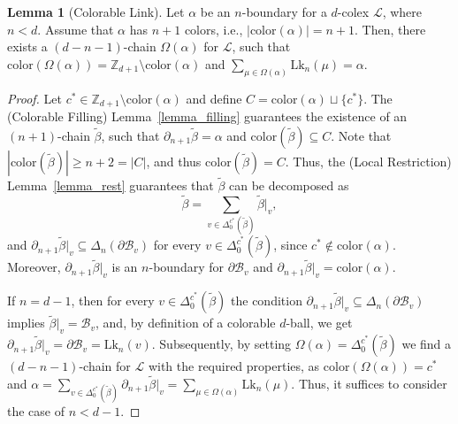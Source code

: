 \documentclass[onecolumn,letterpaper,11pt,accepted=2022-12-19]{quantumarticle}
\newcommand{\face}[2]{{\Delta_{#1}(#2)}}
\newcommand{\facex}[3]{{\Delta^{#1}_{#2}(#3)}}
\newcommand{\link}[2]{{\mathrm{Lk}_{#1}(#2)}}
\newcommand{\rest}[1]{|_{#1}}
\newcommand{\col}[1]{{\mathrm{color}(#1)}}
\theoremstyle{definition}
\newtheorem{lemma}{Lemma}
\theoremstyle{lemma}
\theoremstyle{theorem}
\theoremstyle{corollary}
\begin{document}
{\begin{lemma}[Colorable Link]
\label{lemma_link}
Let $\alpha$ be an $n$-boundary for a $d$-colex $\mathcal{L}$, where $n<d$.
Assume that $\alpha$ has $n+1$ colors, i.e., $|\col \alpha| = n+1$.
Then, there exists a $(d-n-1)$-chain $\Omega(\alpha)$ for $\mathcal{L}$, such that $\col{\Omega(\alpha)} = \mathbb{Z}_{d+1}\setminus \col\alpha$ and $\sum_{\mu \in \Omega(\alpha)} \link n \mu = \alpha$.
\end{lemma}


\begin{proof}
Let $c^*\in\mathbb Z_{d+1}\setminus\col\alpha$ and define $C = \col\alpha \sqcup \{ c^* \}$.
The (Colorable Filling) Lemma~\ref{lemma_filling} guarantees the existence of an $(n+1)$-chain $\widetilde\beta$, such that $\partial_{n+1}\widetilde\beta = \alpha$ and $\col{\widetilde\beta} \subseteq C$.
Note that $|\col{\widetilde\beta}| \geq n+2 = |C|$, and thus $\col{\widetilde\beta} = C$.
Thus, the (Local Restriction) Lemma~\ref{lemma_rest} guarantees that $\widetilde\beta$ can be decomposed as
\begin{equation}
\widetilde\beta = \sum_{v \in \facex {c^*} 0 {\widetilde\beta}} \widetilde\beta\rest v,
\end{equation}
and $\partial_{n+1}\widetilde\beta\rest v \subseteq \face n {\partial\mathcal{B}_v}$ for every $v \in \facex {c^*} 0 {\widetilde\beta}$, since $c^* \not\in\col\alpha$.
Moreover, $\partial_{n+1}\widetilde\beta\rest v$ is an $n$-boundary for $\partial\mathcal{B}_v$ and $\partial_{n+1} \widetilde\beta\rest v = \col\alpha$.

If $n = d-1$, then for every $v \in \facex {c^*} 0 {\widetilde\beta}$ the condition $\partial_{n+1}\widetilde\beta\rest v \subseteq \face n {\partial\mathcal{B}_v}$ implies $\widetilde\beta\rest v = \mathcal{B}_v$, and, by definition of a colorable $d$-ball, we get $\partial_{n+1}\widetilde\beta\rest v = \partial \mathcal{B}_v = \link n v$.
Subsequently, by setting $\Omega(\alpha) = \facex {c^*} 0 {\widetilde\beta}$ we find a $(d-n-1)$-chain for $\mathcal{L}$ with the required properties, as $\col{\Omega(\alpha)} = c^*$ and $\alpha = \sum_{v \in \facex {c^*} 0 {\widetilde\beta}} \partial_{n+1} \widetilde\beta\rest v = \sum_{\mu\in\Omega(\alpha)} \link n \mu$.
Thus, it suffices to consider the case of $n<d-1$.



\end{proof}}
\end{document}
